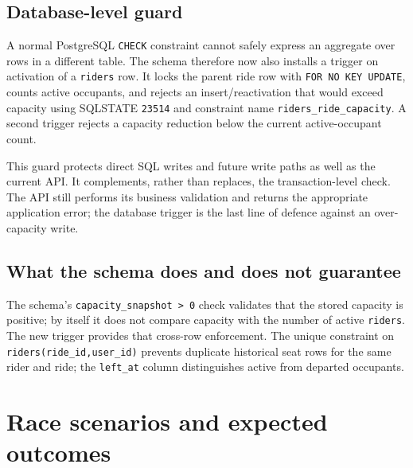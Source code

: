 \documentclass[11pt,a4paper]{article}
\begin{document}
\subsection{Database-level guard}

A normal PostgreSQL \texttt{CHECK} constraint cannot safely express an aggregate over rows in a
different table. The schema therefore now also installs a trigger on activation of a
\texttt{riders} row. It locks the parent ride row with \texttt{FOR NO KEY UPDATE}, counts active
occupants, and rejects an insert/reactivation that would exceed capacity using SQLSTATE
\texttt{23514} and constraint name \texttt{riders\_ride\_capacity}. A second trigger rejects a
capacity reduction below the current active-occupant count.

This guard protects direct SQL writes and future write paths as well as the current API. It
complements, rather than replaces, the transaction-level check. The API still performs its
business validation and returns the appropriate application error; the database trigger is the
last line of defence against an over-capacity write.

\subsection{What the schema does and does not guarantee}

The schema's \texttt{capacity\_snapshot > 0} check validates that the stored capacity is positive;
by itself it does not compare capacity with the number of active \texttt{riders}. The new trigger
provides that cross-row enforcement. The unique constraint on
\texttt{riders(ride\_id,user\_id)} prevents duplicate historical seat rows for the same rider and
ride; the \texttt{left\_at} column distinguishes active from departed occupants.

\section{Race scenarios and expected outcomes}
\end{document}
